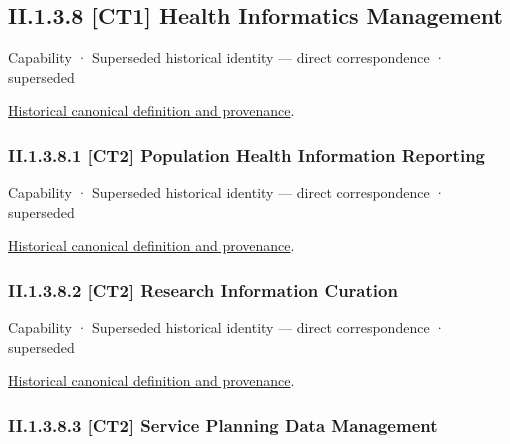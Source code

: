 \subsection*{II.1.3.8 [CT1] Health Informatics Management}
\label{navigation:II.1.3.8}

\label{element:50c56bac0dc540a2b392fc2376efc129}
{\small Capability · Superseded historical identity — direct correspondence · superseded}\par
\href{../../../../continuum/strategy/capability/50c56bac0dc540a2b392fc2376efc129.md}{Historical canonical definition and provenance}.\par
\subsubsection*{II.1.3.8.1 [CT2] Population Health Information Reporting}
\label{navigation:II.1.3.8.1}

\label{element:ced472b2d1a54016878ee541de969d9b}
{\small Capability · Superseded historical identity — direct correspondence · superseded}\par
\href{../../../../continuum/strategy/capability/ced472b2d1a54016878ee541de969d9b.md}{Historical canonical definition and provenance}.\par
\subsubsection*{II.1.3.8.2 [CT2] Research Information Curation}
\label{navigation:II.1.3.8.2}

\label{element:11203b9c80964a9b96883eeab07f41d5}
{\small Capability · Superseded historical identity — direct correspondence · superseded}\par
\href{../../../../continuum/strategy/capability/11203b9c80964a9b96883eeab07f41d5.md}{Historical canonical definition and provenance}.\par
\subsubsection*{II.1.3.8.3 [CT2] Service Planning Data Management}
\label{navigation:II.1.3.8.3}

